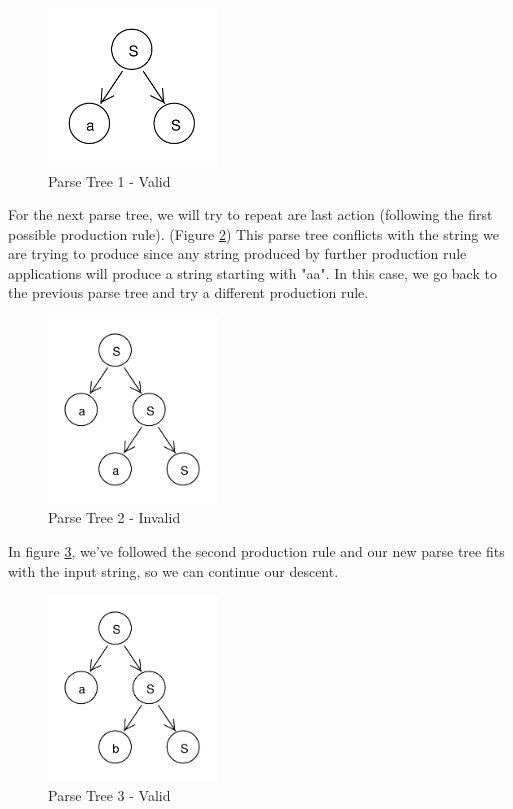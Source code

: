 \documentclass[11pt]{article}
\begin{document}
\begin{figure}[h!]
    \centering
    \includegraphics[width=0.4\textwidth,natwidth=30,natheight=30]{rdp_1.pdf}
    \caption{Parse Tree 1 - Valid}
    \label{fig:rdp_1}
\end{figure}

For the next parse tree, we will try to repeat are last action (following the first possible production rule).
(Figure \ref{fig:rdp_2}) This parse tree conflicts with the string we are trying to produce since any
string produced by further production rule applications will produce a string starting with "aa".
In this case, we go back to the previous parse tree and try a different production rule.

\begin{figure}[h!]
    \centering
    \includegraphics[width=0.4\textwidth,natwidth=30,natheight=30]{rdp_2.pdf}
    \caption{Parse Tree 2 - Invalid}
    \label{fig:rdp_2}
\end{figure}

In figure \ref{fig:rdp_3}, we've followed the second production rule
and our new parse tree fits with the input string, so we can continue our descent.

\begin{figure}[h!]
    \centering
    \includegraphics[width=0.4\textwidth,natwidth=30,natheight=30]{rdp_3.pdf}
    \caption{Parse Tree 3 - Valid}
    \label{fig:rdp_3}
\end{figure}
\end{document}
